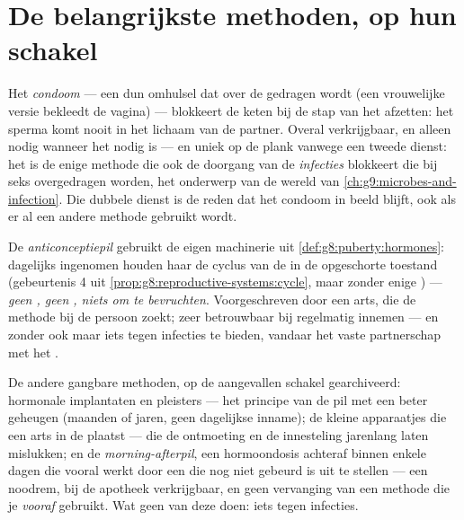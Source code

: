 \section{De belangrijkste methoden, op hun schakel}

\begin{definition}\label{def:g8:contraception:condom}
Het \emph{condoom} --- een dun omhulsel dat over de 
gedragen wordt (een vrouwelijke versie bekleedt de vagina) --- blokkeert de
keten bij de stap van het afzetten: het sperma komt nooit in het lichaam
van de partner. Overal verkrijgbaar, en alleen nodig wanneer het nodig is
--- en uniek op de plank vanwege een tweede dienst: het is de enige
methode die ook de doorgang van de \emph{infecties} blokkeert die bij seks
overgedragen worden, het onderwerp van de wereld van
\cref{ch:g9:microbes-and-infection}. Die dubbele dienst is de reden dat het
condoom in beeld blijft, ook als er al een andere methode gebruikt wordt.
\end{definition}

\begin{definition}\label{def:g8:contraception:pill}
De \emph{anticonceptiepil} gebruikt de eigen
machinerie uit \cref{def:g8:puberty:hormones}: dagelijks ingenomen houden
haar  de cyclus van de  in de opgeschorte toestand
(gebeurtenis 4 uit \cref{prop:g8:reproductive-systems:cycle}, maar zonder
enige ) --- \emph{geen , geen , niets om te
bevruchten}. Voorgeschreven door een arts, die de methode bij de persoon
zoekt; zeer betrouwbaar bij regelmatig innemen --- en zonder ook maar iets
tegen infecties te bieden, vandaar het vaste partnerschap met het .
\end{definition}

\begin{example}\label{ex:g8:contraception:shelf}
De andere gangbare methoden, op de aangevallen schakel gearchiveerd:
hormonale implantaten en pleisters --- het principe van de pil met een
beter geheugen (maanden of jaren, geen dagelijkse inname); de kleine
apparaatjes die een arts in de  plaatst --- die de ontmoeting en
de innesteling jarenlang laten mislukken; en de \emph{morning-afterpil},
een hormoondosis achteraf binnen enkele dagen die vooral werkt door een
 die nog niet gebeurd is uit te stellen --- een noodrem, bij de
apotheek verkrijgbaar, en geen vervanging van een methode die je
\emph{vooraf} gebruikt. Wat geen van deze doen: iets tegen infecties.
\end{example}

